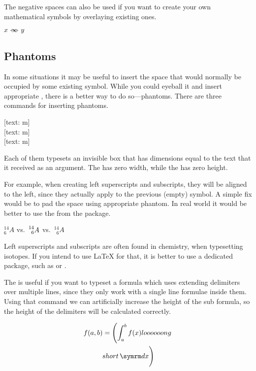 The negative spaces can also be used if you want to create your own
mathematical symbols by overlaying existing ones.
\begin{example}
\NewDocumentCommand{\myrel}{}{
  \mathrel{
    -\mspace{-11mu}
    \infty{}
    \mspace{-11mu}-
  }
}
\( x \myrel y \)
\end{example}

\subsection{Phantoms}

In some situations it may be useful to insert the space that would normally be
occupied by some existing symbol. While you could eyeball it and insert
appropriate , there is a better way to do so---phantoms. There are
three commands for inserting phantoms.
\begin{lscommand}
  [text: m] \\
  [text: m] \\
  [text: m]
\end{lscommand}
Each of them typesets an invisible box that has dimensions equal to the text
that it received as an argument. The  has zero width, while the
 has zero height.

For example, when creating left superscripts and subscripts, they will be
aligned to the left, since they actually apply to the previous (empty) symbol.
A simple fix would be to pad the space using appropriate phantom. In real world
it would be better to use the  from the  package.
\begin{example}
\( {}^{14}_{6}A \) vs.\
\( \prescript{14}{6}A \) vs.\
\( {}^{14}_{\phantom{1}6}A \)
\end{example}
Left superscripts and subscripts are often found in chemistry, when typesetting
isotopes. If you intend to use \LaTeX{} for that, it is better to use a
dedicated package, such as \pai*{chemformula} or \pai*{mhchem}.

The \csi{vphantom} is useful if you want to typeset a formula which uses
extending delimiters over multiple lines, since they only work with a single
line formulae inside them. Using that command we can artificially increase the
height of the sub formula, so the height of the delimiters will be calculated
correctly.
\begin{example}
\begin{multline*}
  f(a, b) = \left(
    \int_a^b f(x)
    loooooong
  \right. \\
  \left.
    \vphantom{
      \int_a^b f(x)
      loooooong
    }
    short \ud x
  \right)
\end{multline*}
\end{example}


